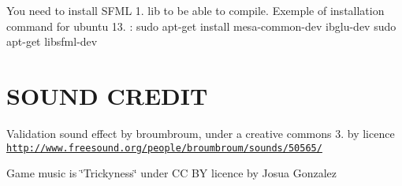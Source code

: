 You need to install S\-F\-M\-L 1. lib to be able to compile. Exemple of installation command for ubuntu 13. \-: sudo apt-\/get install mesa-\/common-\/dev ibglu-\/dev sudo apt-\/get libsfml-\/dev

\section*{S\-O\-U\-N\-D C\-R\-E\-D\-I\-T}

Validation sound effect by broumbroum, under a creative commons 3. by licence \href{http://www.freesound.org/people/broumbroum/sounds/50565/}{\tt http\-://www.\-freesound.\-org/people/broumbroum/sounds/50565/}

Game music is \char`\"{}\-Trickyness\char`\"{} under C\-C B\-Y licence by Josua Gonzalez 
